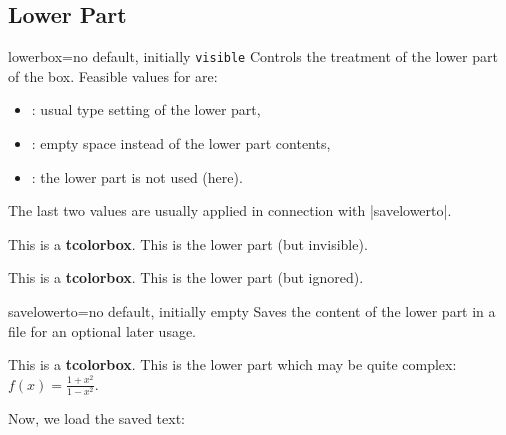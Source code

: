 \clearpage
\subsection{Lower Part}
\begin{docTcbKey}{lowerbox}{=}{no default, initially \texttt{visible}}
  Controls the treatment of the lower part of the box.
  Feasible values for  are:
  \begin{itemize}
  \item{}: usual type setting of the lower part,
  \item{}: empty space instead of the lower part contents,
  \item{}: the lower part is not used (here).
  \end{itemize}
  The last two values are usually applied in connection with |savelowerto|.
\begin{dispExample}
\begin{tcolorbox}[lowerbox=invisible,colback=white]
This is a \textbf{tcolorbox}.
\tcblower
This is the lower part (but invisible).
\end{tcolorbox}

\begin{tcolorbox}[lowerbox=ignored,colback=white]
This is a \textbf{tcolorbox}.
\tcblower
This is the lower part (but ignored).
\end{tcolorbox}
\end{dispExample}
\end{docTcbKey}


\begin{docTcbKey}[][doc updated=2014-11-28]{savelowerto}{=}{no default, initially empty}
  Saves the content of the lower part in a file for an optional later usage.
\begin{dispExample}
\begin{tcolorbox}[lowerbox=invisible,savelowerto=\jobname_bspsave.tex,colback=white]
This is a \textbf{tcolorbox}.
\tcblower
This is the lower part which may be quite complex:
$\displaystyle f(x)=\frac{1+x^2}{1-x^2}$.
\end{tcolorbox}

Now, we load the saved text:\\

\end{dispExample}
\end{docTcbKey}

